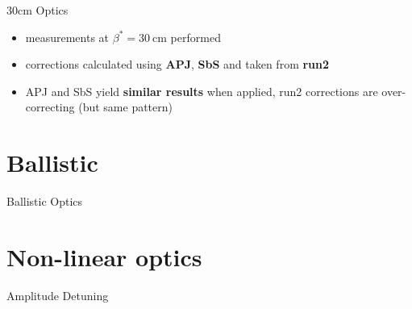 \documentclass[11pt,usenames,dvipsnames,aspectratio=169]{beamer}
\newcommand{\highl}[1]{\textbf{#1}}
\begin{document}
\begin{frame}{30cm Optics}
\begin{center}
{{        }
        }
    \end{center}
    \begin{itemize}
        \item measurements at $\beta^*=\SI{30}{\centi\meter}$ performed
        \item corrections calculated using \highl{APJ}, \highl{SbS} and taken from \highl{run2}
        \item APJ and SbS yield \highl{similar results} when applied,
            run2 corrections are over-correcting (but same pattern)
    \end{itemize}
\end{frame}


\section{Ballistic}
\begin{frame}{Ballistic Optics}
    
\end{frame}


\section{Non-linear optics}


\begin{frame}{Amplitude Detuning}
    
\end{frame}


\end{document}

